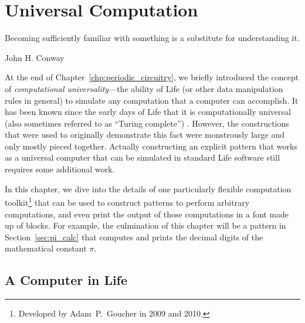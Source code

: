
\renewcommand{\chapterfolder}{universal_computation/}
\chapter{Universal Computation}\label{chp:universal_computation}


\vspace*{-0.4in}
\epigraph{Becoming sufficiently familiar with something is a substitute for understanding it.}{John H. Conway}
\vspace*{0.4in}


\noindent At the end of Chapter~\ref{chp:periodic_circuitry}, we briefly introduced the concept of \emph{computational universality}---the ability of Life (or other data manipulation rules in general) to simulate any computation that a computer can accomplish. It has been known since the early days of Life that it is computationally universal (also sometimes referred to as ``Turing complete'') \cite{BCG82}.  However, the constructions that were used to originally demonstrate this fact were monstrously large and only mostly pieced together. Actually constructing an explicit pattern that works as a universal computer that can be simulated in standard Life software still requires some additional work.

In this chapter, we dive into the details of one particularly flexible computation toolkit\footnote{Developed by Adam~P.~Goucher in 2009 and 2010.} that can be used to construct patterns to perform arbitrary computations, and even print the output of those computations in a font made up of blocks. For example, the culmination of this chapter will be a pattern in Section~\ref{sec:pi_calc} that computes and prints the decimal digits of the mathematical constant $\pi$.


\section{A Computer in Life}\label{sec:computer_in_life}

